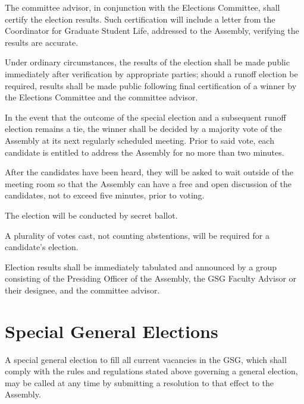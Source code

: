 \begin{bylaws-number}
\begin{bylaws-number}
  \end{bylaws-number}
  \item The committee advisor, in conjunction with the Elections Committee, shall certify the election results. Such certification will include a letter from the Coordinator for Graduate Student Life, addressed to the Assembly, verifying the results are accurate.
  \item Under ordinary circumstances, the results of the election shall be made public immediately after verification by appropriate parties; should a runoff election be required, results shall be made public following final certification of a winner by the Elections Committee and the committee advisor.
  \item In the event that the outcome of the special election and a subsequent runoff election remains a tie, the winner shall be decided by a majority vote of the Assembly at its next regularly scheduled meeting. Prior to said vote, each candidate is entitled to address the Assembly for no more than two minutes.
  \item After the candidates have been heard, they will be asked to wait outside of the meeting room so that the Assembly can have a free and open discussion of the candidates, not to exceed five minutes, prior to voting.
  \item The election will be conducted by secret ballot.
  \item A plurality of votes cast, not counting abstentions, will be required for a candidate’s election.
  \item Election results shall be immediately tabulated and announced by a group consisting of the Presiding Officer of the Assembly, the GSG Faculty Advisor or their designee, and the committee advisor.
\end{bylaws-number}

\section{Special General Elections}
A special general election to fill all current vacancies in the GSG, which shall comply with the rules and regulations stated above governing a general election, may be called at any time by submitting a resolution to that effect to the Assembly.

